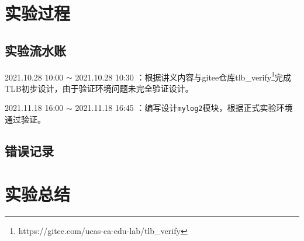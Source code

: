\documentclass[UTF-8,twoside,c5size]{ctexart}
\begin{document}
	\section{实验过程}
	
	\subsection{实验流水账}
	
	2021.10.28 10:00 $\sim$ 2021.10.28 10:30 ：根据讲义内容与gitee仓库tlb\_verify\footnote{https://gitee.com/ucas-ca-edu-lab/tlb_verify}完成TLB初步设计，由于验证环境问题未完全验证设计。
    
    2021.11.18 16:00 $\sim$ 2021.11.18 16:45 ：编写设计\texttt{mylog2}模块，根据正式实验环境通过验证。
    
	\subsection{错误记录}	
	
	
	\section{实验总结}
	
	
	
\end{document}
